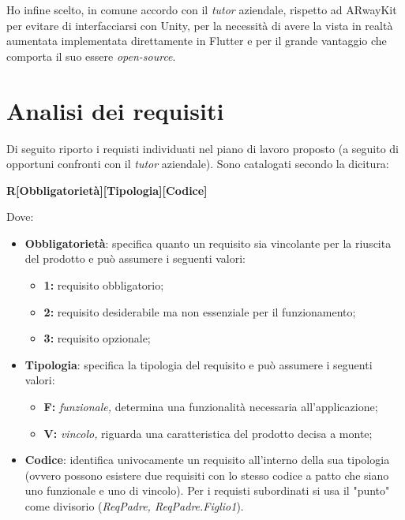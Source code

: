Ho infine scelto, in comune accordo con il \textit{tutor} aziendale, \aplug{} rispetto ad ARwayKit per evitare di interfacciarsi con Unity, per la necessità di avere la vista in realtà aumentata implementata direttamente in Flutter e per il grande vantaggio che comporta il suo essere \textit{open-source}.

\section{Analisi dei requisiti}
\label{sec:analisi_requisiti}
Di seguito riporto i requisti individuati nel piano di lavoro proposto (a seguito di opportuni confronti con il \textit{tutor} aziendale). Sono catalogati secondo la dicitura:
\begin{center}
    \textbf{R[Obbligatorietà][Tipologia][Codice]}
\end{center}
Dove:
\begin{itemize}
    \item \textbf{Obbligatorietà}: specifica quanto un requisito sia vincolante per la riuscita del prodotto e può assumere i seguenti valori:
    \begin{itemize}
        \item \textbf{1: } requisito obbligatorio;
        \item \textbf{2: } requisito desiderabile ma non essenziale per il funzionamento;
        \item \textbf{3: } requisito opzionale;
    \end{itemize}
    \item \textbf{Tipologia}: specifica la tipologia del requisito e può assumere i seguenti valori:
    \begin{itemize}
        \item \textbf{F: }\textit{funzionale,} determina una funzionalità necessaria all'applicazione;
        \item \textbf{V: }\textit{vincolo,} riguarda una caratteristica del prodotto decisa a monte;
    \end{itemize}
    \item \textbf{Codice}: identifica univocamente un requisito all'interno della sua tipologia (ovvero possono esistere due requisiti con lo stesso codice a patto che siano uno funzionale e uno di vincolo). Per i requisti subordinati si usa il "punto" come divisorio (\textit{ReqPadre, ReqPadre.Figlio1}).
\end{itemize}

